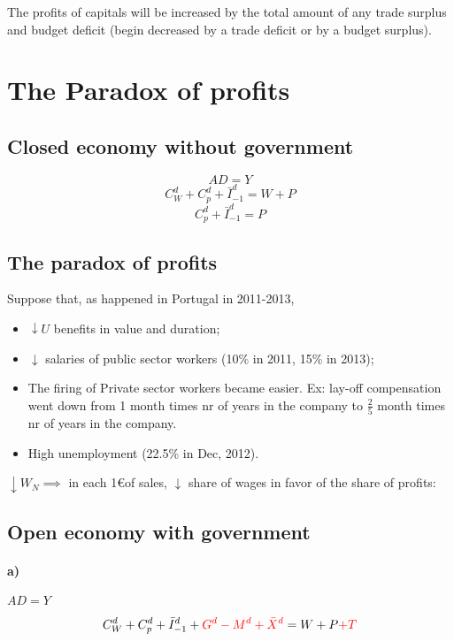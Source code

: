 \documentclass{report}
\begin{document}
The profits of capitals will be increased by the total amount of any trade surplus and budget deficit (begin decreased by a trade deficit or by a budget surplus).

\section{The Paradox of profits}
\subsection{Closed economy without government}

$$
AD=Y
$$
$$
C^d_W+C^d_p+\bar{I}^d_{-1}=W+P
$$
$$
C^d_p+\bar{I}^d_{-1}=P
$$

\subsection{The paradox of profits}

Suppose that, as happened in Portugal in 2011-2013, 
\begin{itemize}
    \item $\downarrow U$ benefits in value and duration; 
    \item $\downarrow$ salaries of public sector workers (10\% in 2011, 15\% in 2013);
    \item The firing of Private sector workers became easier. 
    Ex: lay-off compensation went down from 1 month times nr of years in the company to $\frac{2}{5}$ month times nr of years in the company. 
    \item High unemployment (22.5\% in Dec, 2012).
\end{itemize}

$\downarrow W_N \implies $ in each 1\euro of sales, $\downarrow$ share of wages in favor of the share of profits: 




\subsection{Open economy with government}

\paragraph{a)} $AD=Y$

\begin{equation*}
    C^d_W+C^d_p+\bar{I}^d_{-1}+\textcolor{red}{G^d-M^d+\bar{X}^d}=W+P\textcolor{red}{+T}
\end{equation*}
\end{document}
